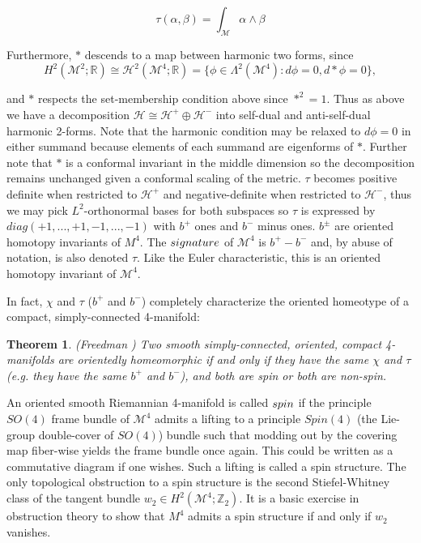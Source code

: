 \documentclass[openany, amssymb, psamsfonts]{amsart}
\newtheorem{thm}{Theorem}[section]
\theoremstyle{definition}
\numberwithin{equation}{section}
\begin{document}
    $$\tau(\alpha, \beta) = \int_{\mathcal{M}} \alpha \wedge \beta$$

    Furthermore, $*$ descends to a map between harmonic two forms, since $$H^2(\mathcal{M}^2; \mathbb{R}) \cong \mathcal{H}^2(\mathcal{M}^4; \mathbb{R}) = \{\phi \in \Lambda^2(\mathcal{M}^4) : d\phi=0, d*\phi = 0\},$$

    and $*$ respects the set-membership condition above since $*^2=1$. Thus as above we have a decomposition $\mathcal{H} \cong \mathcal{H}^+ \oplus \mathcal{H}^-$ into self-dual and anti-self-dual harmonic 2-forms. Note that the harmonic condition may be relaxed to $d\phi=0$ in either summand because elements of each summand are eigenforms of $*$. Further note that $*$ is a conformal invariant in the middle dimension so the decomposition remains unchanged given a conformal scaling of the metric. $\tau$ becomes positive definite when restricted to $\mathcal{H}^+$ and negative-definite when restricted to $\mathcal{H}^-$, thus we may pick $L^2$-orthonormal bases for both subspaces so $\tau$ is expressed by $diag(+1,...,+1, -1,...,-1)$ with $b^+$ ones and $b^-$ minus ones. $b^\pm$ are oriented homotopy invariants of $M^4$. The $\emph{signature}$ of $\mathcal{M}^4$ is $b^+ - b^-$ and, by abuse of notation, is also denoted $\tau$. Like the Euler characteristic, this is an oriented homotopy invariant of $\mathcal{M}^4$. 

    In fact, $\chi$ and $\tau$ ($b^+$ and $b^-$) completely characterize the oriented homeotype of a compact, simply-connected 4-manifold: 

    \begin{thm}
    (Freedman \cite{freed}) Two smooth simply-connected, oriented, compact 4-manifolds are orientedly homeomorphic if and only if they have the same $\chi$ and $\tau$ (e.g. they have the same $b^+$ and $b^-$), and both are spin or both are non-spin.

    \end{thm}

    An oriented smooth Riemannian 4-manifold is called $\emph{spin}$ if the principle $SO(4)$ frame bundle of $\mathcal{M}^4$ admits a lifting to a principle $Spin(4)$ (the Lie-group double-cover of $SO(4)$) bundle such that modding out by the covering map fiber-wise yields the frame bundle once again. This could be written as a commutative diagram if one wishes. Such a lifting is called a spin structure. The only topological obstruction to a spin structure is the second Stiefel-Whitney class of the tangent bundle $w_2 \in H^2(\mathcal{M}^4;\mathbb{Z}_2)$. It is a basic exercise in obstruction theory to show that $M^4$ admits a spin structure if and only if $w_2$ vanishes. 
    
\end{document}
